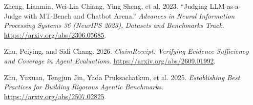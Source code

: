 \documentclass[
  american,
  10pt,
  a4paper,
]{article}
\newlength{\cslhangindent}
\newenvironment{CSLReferences}[2] %
 {\begin{list}{}{%
  \setlength{\itemindent}{0pt}
  \setlength{\leftmargin}{0pt}
  \setlength{\parsep}{0pt}
  \ifodd #1
   \setlength{\leftmargin}{\cslhangindent}
   \setlength{\itemindent}{-1\cslhangindent}
  \fi
  \setlength{\itemsep}{#2\baselineskip}}}
 {\end{list}}
\begin{document}
\begin{CSLReferences}{1}{1}
Zheng, Lianmin, Wei-Lin Chiang, Ying Sheng, et al. 2023. {``Judging
{LLM}-as-a-Judge with {MT}-Bench and Chatbot Arena.''} \emph{Advances in
Neural Information Processing Systems 36 (NeurIPS 2023), Datasets and
Benchmarks Track}. \url{https://arxiv.org/abs/2306.05685}.

Zhu, Peiying, and Sidi Chang. 2026. \emph{ClaimReceipt: Verifying
Evidence Sufficiency and Coverage in Agent Evaluations}.
\url{https://arxiv.org/abs/2609.01992}.

Zhu, Yuxuan, Tengjun Jin, Yada Pruksachatkun, et al. 2025.
\emph{Establishing Best Practices for Building Rigorous Agentic
Benchmarks}. \url{https://arxiv.org/abs/2507.02825}.

\end{CSLReferences}
\end{document}
